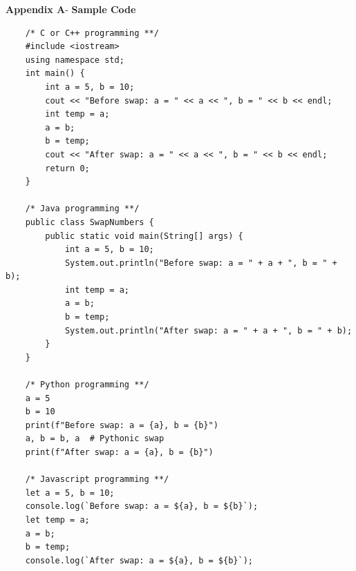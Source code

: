 \begin{center}
	{\Large \textbf{Appendix A}}-\vspace*{0.5 cm}
	{\Large \textbf{Sample Code}}
	
\end{center}
\begin{lstlisting}
	/* C or C++ programming **/
	#include <iostream>
	using namespace std;
	int main() {
		int a = 5, b = 10;
		cout << "Before swap: a = " << a << ", b = " << b << endl;
		int temp = a;
		a = b;
		b = temp;
		cout << "After swap: a = " << a << ", b = " << b << endl;
		return 0;
	}
	
	/* Java programming **/
	public class SwapNumbers {
		public static void main(String[] args) {
			int a = 5, b = 10;
			System.out.println("Before swap: a = " + a + ", b = " + b);
			int temp = a;
			a = b;
			b = temp;
			System.out.println("After swap: a = " + a + ", b = " + b);
		}
	}
	
	/* Python programming **/
	a = 5
	b = 10
	print(f"Before swap: a = {a}, b = {b}")
	a, b = b, a  # Pythonic swap
	print(f"After swap: a = {a}, b = {b}")
	
	/* Javascript programming **/
	let a = 5, b = 10;
	console.log(`Before swap: a = ${a}, b = ${b}`);
	let temp = a;
	a = b;
	b = temp;
	console.log(`After swap: a = ${a}, b = ${b}`);
\end{lstlisting}
